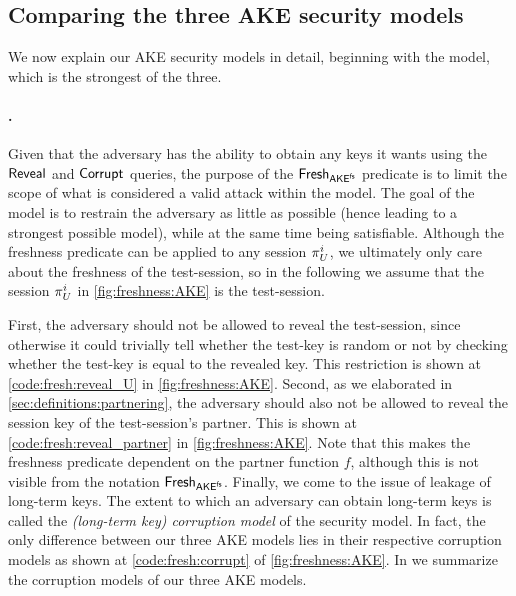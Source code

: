 \subsection{Comparing the three AKE security models}

We now explain our AKE security models in detail,
beginning with the \akefstext model,
which is the strongest of the three.



\paragraph{\texorpdfstring{\akefstext}{AKEfs}.}
Given that the adversary has the ability to obtain any keys it wants using the $\mathsf{Reveal}$ and $\mathsf{Corrupt}$ queries,
the purpose of the $\mathsf{Fresh}_{\mathsf{AKE}^{\mathsf{fs}}}$ predicate is to limit the scope of what is considered a valid attack within the model.
The goal of the \akefstext model is to restrain the adversary as little as possible
(hence leading to a strongest possible model),
while at the same time being satisfiable.
Although the freshness predicate can be applied to any session $\oracle[U][i]$,
we ultimately only care about the freshness of the test-session,
so in the following we assume that the session $\oracle[U][i]$ in \cref{fig:freshness:AKE} is the test-session.

First,
the adversary should not be allowed to reveal the test-session,
since otherwise it could trivially tell whether the test-key is random or not by checking whether the test-key is equal to the revealed key.
This restriction is shown at \cref{code:fresh:reveal_U} in \cref{fig:freshness:AKE}.
Second,
as we elaborated in \cref{sec:definitions:partnering},
the adversary should also not be allowed to reveal the session key of the test-session's partner.
This is shown at \cref{code:fresh:reveal_partner} in \cref{fig:freshness:AKE}.
Note that this makes the freshness predicate dependent on the partner function $f$,
although this is not visible from the notation $\mathsf{Fresh}_{\mathsf{AKE}^{\mathsf{fs}}}$.
Finally,
we come to the issue of leakage of long-term keys.
The extent to which an adversary can obtain long-term keys is called the \emph{(long-term key) corruption model} of the security model.
In fact,
the only difference between our three AKE models lies in their respective corruption models as shown at \cref{code:fresh:corrupt} of \cref{fig:freshness:AKE}.
In  we summarize the corruption models of our three AKE models. 




